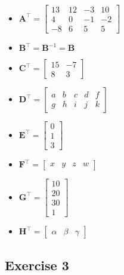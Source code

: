 \documentclass[11pt]{article}
\begin{document}
\begin{itemize}
	\item $\textbf{A}^\intercal=\begin{bmatrix}
		13 & 12 & -3 & 10 \\
		4 & 0 & -1 & -2 \\
		-8 & 6 & 5 & 5
	\end{bmatrix}$
	\item $\textbf{B}^\intercal=\textbf{B}^{-1}=\textbf{B}$
	\item $\textbf{C}^\intercal=\begin{bmatrix}
		15 & -7 \\
		8 & 3
	\end{bmatrix}$
	\item $\textbf{D}^\intercal=\begin{bmatrix}
		a & b & c & d & f \\
		g & h & i & j & k
	\end{bmatrix}$
	\item $\textbf{E}^\intercal=\begin{bmatrix}
		0 \\ 1 \\ 3
	\end{bmatrix}$
	\item $\textbf{F}^\intercal=\begin{bmatrix}
		x & y & z & w
	\end{bmatrix}$
	\item $\textbf{G}^\intercal=\begin{bmatrix}
		10 \\ 20 \\ 30 \\ 1
	\end{bmatrix}$
	\item $\textbf{H}^\intercal=\begin{bmatrix}
		\alpha & \beta & \gamma
	\end{bmatrix}$
\end{itemize}

\subsection{Exercise 3}
\end{document}
